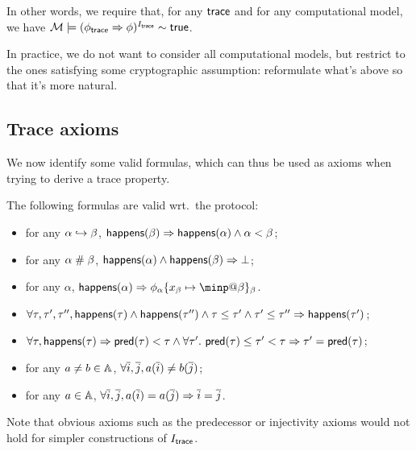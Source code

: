 In other words, we require that, for any $\textsf{trace}$ and
for any computational model,
we have $\mathcal{M} \models (\phi_{\textsf{trace}}\Rightarrow\phi)^{I_{\textsf{trace}}} \sim \textsf{true}$.

In practice, we do not want to consider all computational models, but
restrict to the ones satisfying some cryptographic assumption: reformulate
what's above so that it's more natural.

\subsection{Trace axioms}

We now identify some valid formulas, which can thus be used as axioms
when trying to derive a trace property.

\begin{proposition}
  The following formulas are valid wrt.\ the protocol:
  \begin{itemize}
    \item for any $\alpha \hookrightarrow \beta$,
      $\textsf{happens}(\beta) \Rightarrow \textsf{happens}(\alpha) \wedge \alpha < \beta$;
    \item for any $\alpha \mathrel{\#} \beta$,
      $\textsf{happens}(\alpha)\wedge\textsf{happens}(\beta) \Rightarrow \bot$;
    \item for any $\alpha$,
      $\happens(\alpha) \Rightarrow 
      \phi_\alpha\{x_\beta\mapsto\minp@\beta\}_\beta$.
    \item
      $\forall \tau,\tau',\tau'', \textsf{happens}(\tau)\wedge\textsf{happens}(\tau'')\wedge
      \tau\leq\tau'\wedge\tau'\leq\tau''\Rightarrow\textsf{happens}(\tau')$;
    \item
      $\forall \tau, \textsf{happens}(\tau) \Rightarrow \textsf{pred}(\tau)<\tau \wedge
      \forall \tau'.~ \textsf{pred}(\tau)\leq\tau'<\tau \Rightarrow
      \tau'=\textsf{pred}(\tau)$;
    \item for any $a\neq b\in\mathbb{A}$,
      $\forall \overline{i},\overline{j}, a(\overline{i})\neq b(\overline{j})$;
    \item for any $a\in\mathbb{A}$,
      $\forall \overline{i},\overline{j}, a(\overline{i})=a(\overline{j}) \Rightarrow \overline{i}=\overline{j}$.
  \end{itemize}
\end{proposition}

Note that obvious axioms such as the predecessor or injectivity axioms
would not hold for simpler constructions of $I_{\textsf{trace}}$.
